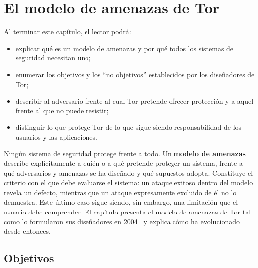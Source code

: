\chapter{El modelo de amenazas de Tor}\label{cap:04-modello-minaccia}

\begin{obiettivi}
Al terminar este capítulo, el lector podrá:
\begin{itemize}[nosep]
  \item explicar qué es un modelo de amenazas y por qué todos los sistemas de seguridad necesitan uno;
  \item enumerar los objetivos y los \enquote{no objetivos} establecidos por los diseñadores de Tor;
  \item describir al adversario frente al cual Tor pretende ofrecer protección y a aquel frente al que no puede resistir;
  \item distinguir lo que protege Tor de lo que sigue siendo responsabilidad de los usuarios y las aplicaciones.
\end{itemize}
\end{obiettivi}

Ningún sistema de seguridad protege frente a todo. Un \textbf{modelo de amenazas} describe explícitamente a quién o a qué pretende proteger un sistema, frente a qué adversarios y amenazas se ha diseñado y qué supuestos adopta. Constituye el criterio con el que debe evaluarse el sistema: un ataque exitoso dentro del modelo revela un defecto, mientras que un ataque expresamente excluido de él no lo demuestra. Este último caso sigue siendo, sin embargo, una limitación que el usuario debe comprender. El capítulo presenta el modelo de amenazas de Tor tal como lo formularon sus diseñadores en 2004~\cite{dingledine2004tor} y explica cómo ha evolucionado desde entonces.

\section{Objetivos}\label{sec:minaccia-obiettivi}

